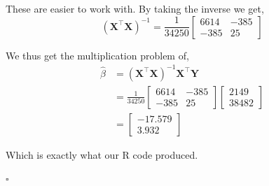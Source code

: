 \documentclass[12pt,letterpaper, onecolumn]{exam}
\begin{document}
\begin{questions}
\begin{solution}
\begin{enumerate}[a.)]
            These are easier to work with. By taking the inverse we get,
            \begin{equation*}
                ( \textbf{X}^\intercal\textbf{X})^{-1} = \frac{1}{34250} \left[\begin{array}{cc}
                    6614 & -385 \\ -385 & 25
                \end{array} \right]
            \end{equation*}

            We thus get the multiplication problem of,
            \begin{align*}
                \hat\beta &= ( \textbf{X}^\intercal\textbf{X})^{-1}\textbf{X}^\intercal\textbf{Y}\\&= \frac{1}{34250} \left[\begin{array}{cc}
                    6614 & -385 \\ -385 & 25
                \end{array} \right]\left[\begin{array}{c}
                    2149 \\ 38482
                \end{array} \right]
                \\ &=\left[\begin{array}{c}
                    -17.579 \\ 3.932
                \end{array} \right]
            \end{align*}

            Which is exactly what our R code produced.

        \end{enumerate}        
        
        $\square$
        
    \end{solution}

    
\end{questions}
\end{document}
